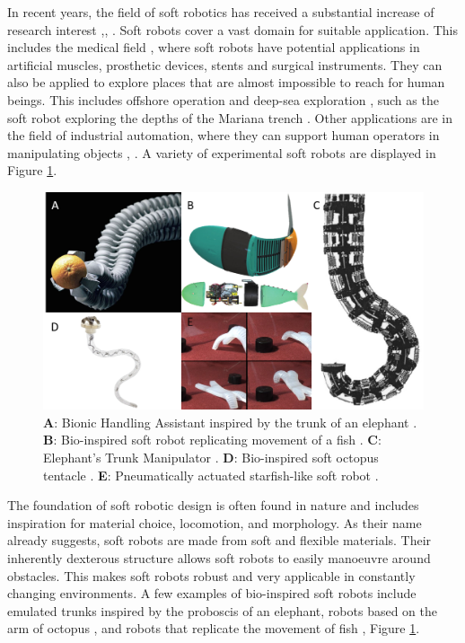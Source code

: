 \label{chapter1}

In recent years, the field of soft robotics has received a substantial increase of research interest \cite{iida2011soft},\cite{walker2020soft}, \cite{bao2018soft}. Soft robots cover a vast domain for suitable application. This includes the medical field \cite{sitti2018miniature} \cite{ashuri2020biomedical}, where soft robots have potential applications in artificial muscles, prosthetic devices, stents and surgical instruments. They can also be applied to explore places that are almost impossible to reach for human beings. This includes offshore operation and deep-sea exploration \cite{aracri2021soft}, such as the soft robot exploring the depths of the Mariana trench \cite{laschi2021soft}. Other applications are in the field of industrial automation, where they can support human operators in manipulating objects \cite{george2018control}, \cite{grissom2006design}. A variety of experimental soft robots are displayed in Figure \ref{fig1:softexample}. 



\begin{figure}[H]       
    \centering
    \includegraphics[width = \textwidth]{Figures/Chapter1/robotexamples.png}
    \caption{\textbf{A}: Bionic Handling Assistant inspired by the trunk of an elephant \cite{BHA}. \textbf{B}: Bio-inspired soft robot replicating movement of a fish \cite{marchese2014}. \textbf{C}: Elephant’s Trunk Manipulator \cite{hannan2003kinematics}. \textbf{D}: Bio-inspired soft octopus tentacle \cite{laschi2012soft}. \textbf{E}: Pneumatically actuated starfish-like soft robot \cite{shepherd2011multigait}.}
    \label{fig1:softexample}
\end{figure}


The foundation of soft robotic design is often found in nature and includes inspiration for material choice, locomotion, and morphology. As their name already suggests, soft robots are made from soft and flexible materials. Their inherently dexterous structure allows soft robots to easily manoeuvre around obstacles. This makes soft robots robust and very applicable in constantly changing environments. A few examples of bio-inspired soft robots include emulated trunks \cite{hannan2003kinematics} inspired by the proboscis of an elephant, robots based on the arm of octopus \cite{wang2013visual}, and robots that replicate the movement of fish \cite{marchese2014}, Figure \ref{fig1:softexample}. 


